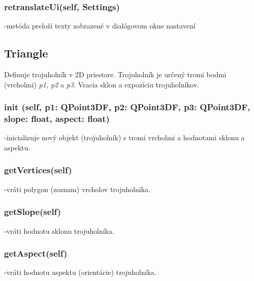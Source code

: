 \documentclass[12pt]{article}
\begin{document}
\subsubsection*{retranslateUi(self, Settings)}
\noindent-metóda preloží texty zobrazené v dialógovom okne nastavení
\subsection*{Triangle}
Definuje trojuholník v 2D priestore. Trojuholník je určený tromi bodmi (vrcholmi) \textit{p1, p2} a \textit{p3}. Vracia sklon a expozíciu trojuholníkov.
\subsubsection*{\textunderscore \textunderscore init \textunderscore \textunderscore (self, p1: QPoint3DF, p2: QPoint3DF, p3: QPoint3DF, slope: float, aspect: float)}
\noindent-inicializuje nový objekt (trojuholník) s tromi vrcholmi a hodnotami sklonu a aspektu.
\subsubsection*{getVertices(self)}
\noindent-vráti polygon (zoznam) vrcholov trojuholníka.
\subsubsection*{getSlope(self)}
\noindent-vráti hodnotu sklonu trojuholníka.
\subsubsection*{getAspect(self)}
\noindent-vráti hodnotu aspektu (orientácie) trojuholníka.
\end{document}
